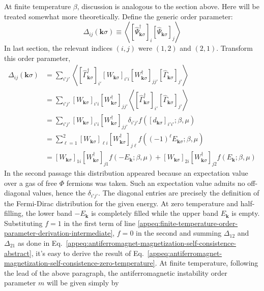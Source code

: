 At finite temperature $\beta$, discussion is analogous to the section above. Here will be treated somewhat more theoretically. Define the generic order parameter:
\[
	\Delta_{ij} (\mathbf{k}\sigma) \equiv \left\langle
		[
			\hat \Psi_{\mathbf{k}\sigma}^\dagger
		]_i [
			\hat \Psi_{\mathbf{k}\sigma}
		]_j
	\right\rangle
\]
In last section, the relevant indices $(i,j)$ were $(1,2)$ and $(2,1)$. Transform this order parameter,
\begin{align}
	\Delta_{ij} (\mathbf{k}\sigma) &= \sum_{i'j'} \left\langle
		[
			\hat\Gamma_{\mathbf{k}\sigma}^\dagger
		]_{i'} 
		[
			W_{\mathbf{k}\sigma}
		]_{i'i} [
			W_{\mathbf{k}\sigma}^\dagger
		]_{jj'}
		[
			\hat\Gamma_{\mathbf{k}\sigma}
		]_{j'}
	\right\rangle \nonumber \\
	&= 
	\sum_{i'j'} [
		W_{\mathbf{k}\sigma}
	]_{i'i} [
		W_{\mathbf{k}\sigma}^\dagger
	]_{jj'}
	\left\langle
		[
			\hat\Gamma_{\mathbf{k}\sigma}^\dagger
		]_{i'} 
		[
			\hat\Gamma_{\mathbf{k}\sigma}
		]_{j'}
	\right\rangle \nonumber \\
	&= 
	\sum_{i'j'} [
		W_{\mathbf{k}\sigma}
	]_{i'i} [
		W_{\mathbf{k}\sigma}^\dagger
	]_{jj'}
	\delta_{i'j'} f\left(
		[d_{\mathbf{k}\sigma}]_{i'i'}; \beta,\mu
	\right) \nonumber \\
	&= 
	\sum_{\ell=1}^2 [
		W_{\mathbf{k}\sigma}
	]_{\ell i} [
		W_{\mathbf{k}\sigma}^\dagger
	]_{j\ell}
	f\left(
		(-1)^\ell E_{\mathbf{k}\sigma}; \beta,\mu
	\right) \nonumber \\
	&= 
	[
		W_{\mathbf{k}\sigma}
	]_{1 i} [
		W_{\mathbf{k}\sigma}^\dagger
	]_{j 1} f\left(
		-E_\mathbf{k}; \beta,\mu
	\right) + [
		W_{\mathbf{k}\sigma}
	]_{2 i} [
		W_{\mathbf{k}\sigma}^\dagger
	]_{j 2} f\left(
		E_\mathbf{k}; \beta,\mu
	\right) \label{appeq:finite-temperature-order-parameter-derivation-intermediate}
\end{align}
In the second passage this distribution appeared because an expectation value over a gas of free $\Phi$ fermions was taken. Such an expectation value admits no off-diagonal values, hence the $\delta_{i'j'}$. The diagonal entries are precisely the definition of the Fermi-Dirac distribution for the given energy. At zero temperature and half-filling, the lower band $-E_\mathbf{k}$ is completely filled while the upper band $E_\mathbf{k}$ is empty. Substituting $f=1$ in the first term of line \eqref{appeq:finite-temperature-order-parameter-derivation-intermediate}, $f=0$ in the second and summing $\Delta_{12}$ and $\Delta_{21}$ as done in Eq.~\eqref{appeq:antiferromagnet-magnetization-self-consistence-abstract}, it's easy to derive the result of Eq.~\eqref{appeq:antiferromagnet-magnetization-self-consistence-zero-temperature}. At finite temperature, following the lead of the above paragraph, the antiferromagnetic instability order parameter $m$ will be given simply by

